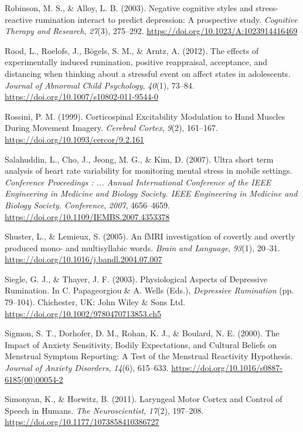 \documentclass[a4paper,12pt,twoside,openright,oldfontcommands]{memoir}
\begin{document}
\hypertarget{ref-Robinson2003}{}
Robinson, M. S., \& Alloy, L. B. (2003). Negative cognitive styles and
stress-reactive rumination interact to predict depression: A prospective
study. \emph{Cognitive Therapy and Research}, \emph{27}(3), 275--292.
\url{https://doi.org/10.1023/A:1023914416469}

\hypertarget{ref-Rood2012}{}
Rood, L., Roelofs, J., Bögels, S. M., \& Arntz, A. (2012). The effects
of experimentally induced rumination, positive reappraisal, acceptance,
and distancing when thinking about a stressful event on affect states in
adolescents. \emph{Journal of Abnormal Child Psychology}, \emph{40}(1),
73--84. \url{https://doi.org/10.1007/s10802-011-9544-0}

\hypertarget{ref-rossini_corticospinal_1999}{}
Rossini, P. M. (1999). Corticospinal Excitability Modulation to Hand
Muscles During Movement Imagery. \emph{Cerebral Cortex}, \emph{9}(2),
161--167. \url{https://doi.org/10.1093/cercor/9.2.161}

\hypertarget{ref-Salahuddin2007}{}
Salahuddin, L., Cho, J., Jeong, M. G., \& Kim, D. (2007). Ultra short
term analysis of heart rate variability for monitoring mental stress in
mobile settings. \emph{Conference Proceedings : ... Annual International
Conference of the IEEE Engineering in Medicine and Biology Society. IEEE
Engineering in Medicine and Biology Society. Conference}, \emph{2007},
4656--4659. \url{https://doi.org/10.1109/IEMBS.2007.4353378}

\hypertarget{ref-shuster_fmri_2005}{}
Shuster, L., \& Lemieux, S. (2005). An fMRI investigation of covertly
and overtly produced mono- and multisyllabic words. \emph{Brain and
Language}, \emph{93}(1), 20--31.
\url{https://doi.org/10.1016/j.bandl.2004.07.007}

\hypertarget{ref-papageorgiou_physiological_2003}{}
Siegle, G. J., \& Thayer, J. F. (2003). Physiological Aspects of
Depressive Rumination. In C. Papageorgiou \& A. Wells (Eds.),
\emph{Depressive Rumination} (pp. 79--104). Chichester, UK: John Wiley
\& Sons Ltd. \url{https://doi.org/10.1002/9780470713853.ch5}

\hypertarget{ref-sigmon_impact_2000}{}
Sigmon, S. T., Dorhofer, D. M., Rohan, K. J., \& Boulard, N. E. (2000).
The Impact of Anxiety Sensitivity, Bodily Expectations, and Cultural
Beliefs on Menstrual Symptom Reporting: A Test of the Menstrual
Reactivity Hypothesis. \emph{Journal of Anxiety Disorders},
\emph{14}(6), 615--633.
\url{https://doi.org/10.1016/s0887-6185(00)00054-2}

\hypertarget{ref-simonyan_laryngeal_2011}{}
Simonyan, K., \& Horwitz, B. (2011). Laryngeal Motor Cortex and Control
of Speech in Humans. \emph{The Neuroscientist}, \emph{17}(2), 197--208.
\url{https://doi.org/10.1177/1073858410386727}
\end{document}
